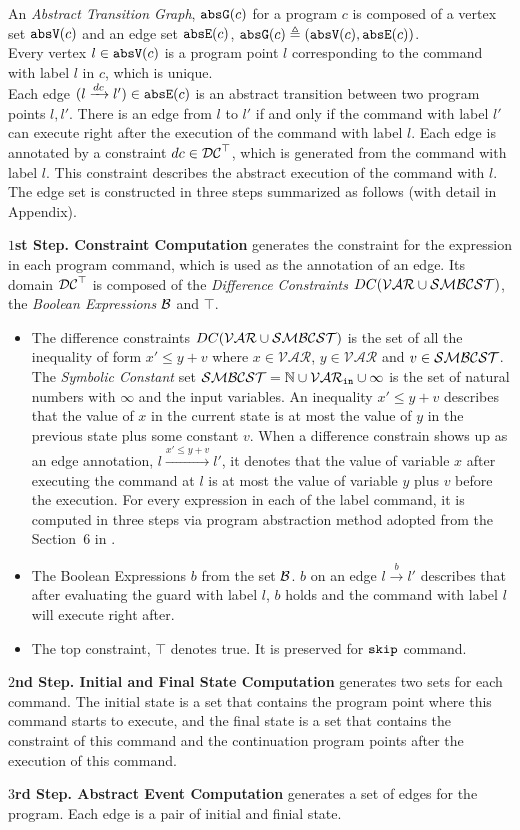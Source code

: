 An \emph{Abstract Transition Graph}, ${\mathtt{abs}}{{\mathtt{G}}}(c)$ for a program $c$ is composed of
a vertex set ${\mathtt{abs}}{{\mathtt{V}}}(c)$ and an edge set ${\mathtt{abs}}{{\mathtt{E}}}(c)$, ${\mathtt{abs}}{{\mathtt{G}}}(c) \triangleq ({\mathtt{abs}}{{\mathtt{V}}}(c), {\mathtt{abs}}{{\mathtt{E}}}(c))$.
\\
Every 
vertex $l \in {\mathtt{abs}}{{\mathtt{V}}}(c)$ is a program point $l$ corresponding to the command with label $l$ in $c$, which is unique.
\\
Each edge $(l \xrightarrow{dc} l') \in {\mathtt{abs}}{{\mathtt{E}}}(c)$ is an abstract transition
between two program points $l, l'$. 
There is an edge from $l$ to $l'$ if and only if
the command with label $l'$ can execute right after the execution of the command with label $l$.
Each edge is annotated by a constraint $dc \in \mathcal{DC}^{\top}$, which is generated from the command with label $l$.
This constraint describes the abstract execution of the command with $l$. 
The edge set is constructed in three steps summarized as follows (with detail in Appendix).

\textbf{$1$st Step. Constraint Computation} generates the constraint
for the expression in each program command,
which is used as the annotation of an edge.
Its domain $\mathcal{DC}^{\top}$ is composed of the \emph{Difference Constraints} $DC(\mathcal{VAR}  \cup \mathcal{SMBCST})$,
the \emph{Boolean Expressions} $\mathcal{B}$ and $\top$.
%
\begin{itemize}
\item The difference constraints $DC(\mathcal{VAR}  \cup \mathcal{SMBCST})$ is the set of all the inequality of
form $x' \leq y + v$ where $x \in \mathcal{VAR} $, 
$y \in \mathcal{VAR}$ and $v \in \mathcal{SMBCST}$.
The \emph{Symbolic Constant} set $\mathcal{SMBCST} = \mathbb{N} \cup \mathcal{VAR}_{{\mathtt{in}}} \cup {\infty}$
is the set of natural numbers with $\infty$ and the input variables.
An inequality $x' \leq y + v$ describes that the value of $x$ in the current state is
at most the value of $y$ in the previous state plus some constant $v$.
When a difference constrain shows up as an edge annotation, $l \xrightarrow{x' \leq y + v} l'$,
it denotes that
the value of variable $x$
after executing the command at $l$ is at most
the value of variable $y$ plus $v$ before the execution.
For every expression in each of the label command, it is computed in three steps via program abstraction method adopted from the Section~6 in \cite{sinn2017complexity}. 
%
\item The Boolean Expressions $b$ from the set $\mathcal{B}$.
$b$ on an edge $l \xrightarrow{b} l'$ describes
that after evaluating the guard with label $l$,
$b$ holds and the command with label $l$ will execute right after.
%
\item The top constraint, $\top$ denotes true. It is preserved for ${\mathtt{skip}}$ command.
%
\end{itemize}

\textbf{$2$nd Step. Initial and Final State Computation} generates two sets for each command.
The initial state is a set that contains the program point where this command {starts} to execute, and the final state is a set
that contains the constraint of this command and the continuation program points after the execution of this command.

\textbf{$3$rd Step. Abstract Event Computation} generates a set of edges for the program. Each edge is a pair of initial and finial state.